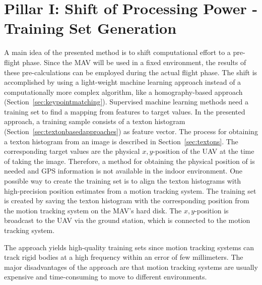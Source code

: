 \documentclass{report}
\begin{document}
\section{Pillar I: Shift of Processing Power - Training Set
  Generation}
\label{sec:mapping}


A main idea of the presented method is to shift computational effort
to a pre-flight phase. Since the MAV will be used in a fixed
environment, the results of these pre-calculations can be employed
during the actual flight phase. The shift is accomplished by using a
light-weight machine learning approach instead of a computationally
more complex algorithm, like a homography-based approach
(Section~\ref{sec:keypointmatching}). Supervised machine learning
methods need a training set to find a mapping from features to target
values. In the presented approach, a training sample consists of a
texton histogram (Section~\ref{sec:textonbasedapproaches}) as feature
vector. The process for obtaining a texton histogram from an image is
described in Section~\ref{sec:textons}. The corresponding target
values are the physical $x,y$-position of the UAV at the time of
taking the image. Therefore, a method for obtaining the physical
position of is needed and GPS information is not available in the
indoor environment. One possible way to create the training set is to
align the texton histograms with high-precision position estimates
from a motion tracking system.
The training set is created by saving the texton histogram with the
corresponding position from the motion tracking system on the MAV's
hard disk. The $x,y$-position is broadcast to the UAV via the ground
station, which is connected to the motion tracking system.

The approach yields high-quality training sets since motion tracking
systems can track rigid bodies at a high frequency within an error of
few millimeters. The major disadvantages of the approach are that
motion tracking systems are usually expensive and time-consuming to
move to different environments.
\end{document}
